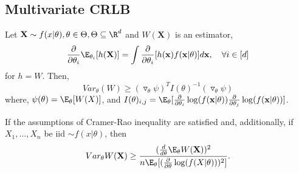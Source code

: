 \documentclass[a4paper,english,12pt]{article}
\newcommand{\bx}{\mathbf{x}}
\newcommand{\bX}{\mathbf{X}}
\begin{document}
\subsection{Multivariate CRLB}
Let $\bX \sim f(x|\theta), \theta \in \Theta, \Theta \subseteq \R^d$ and $W(\bX)$ is an estimator,
\begin{equation}
\frac{\partial}{\partial\theta_i} \E_{\theta_i}[h(\bX)]=\int \frac{\partial}{\partial\theta_i} [h(\bx)f(\bx|\theta)] d\bx, \quad \forall i \in [d]
\end{equation}
for $h = W$. Then,
\begin{equation}
Var_\theta(W) \geq (\triangledown_\theta\psi)^TI(\theta)^{-1}(\triangledown_\theta\psi)
\end{equation}
where, $\psi(\theta) = \E_\theta[W(X)]$, and $I(\theta)_{i,j} = \E_\theta[\frac{\partial}{\partial\theta_i} \log(f(\bx|\theta))\frac{\partial}{\partial\theta_j} \log(f(\bx|\theta))]$.
\begin{cor}
If the assumptions of Cramer-Rao inequality are satisfied and, additionally, if $X_1,\dots, X_n$ be iid $\sim f(x|\theta)$, then
\begin{equation*}
Var_{\theta} W(\bX) \geq \frac{(\frac{d}{d\theta} \E_{\theta}W(\bX))^2}{n\E_{\theta}[(\frac{\partial}{\partial\theta} \log (f(X|\theta)))^2]}.
\end{equation*}
\end{cor}
\end{document}
